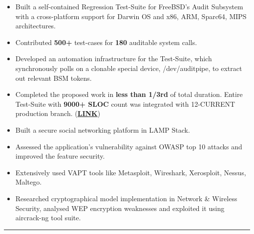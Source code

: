 \documentclass[10pt, margin=0.5in]{deedy-resume-openfont}
\begin{document}
\begin{minipage}[t]{0.48\textwidth}
\vspace{5pt}
\begin{itemize}[leftmargin=*, noitemsep]
\item Built a self-contained Regression Test-Suite for FreeBSD's Audit Subsystem with a cross-platform support for Darwin OS and x86, ARM, Sparc64, MIPS architectures.
  \item Contributed \textbf{500+} test-cases for \textbf{180} auditable system calls.
  \item Developed an automation infrastructure for the Test-Suite, which synchronously polls on a clonable special device, /dev/auditpipe, to extract out relevant BSM tokens.
  \item	Completed the proposed work in \textbf{less than 1/3rd} of total duration. Entire Test-Suite with \textbf{9000+ SLOC} count was integrated with 12-CURRENT production branch. (\href{https://github.com/freebsd/freebsd/tree/master/tests/sys/audit}{\textbf{LINK}})
\end{itemize}


\vspace{5pt}
\begin{itemize}[leftmargin=*, noitemsep]
  \item Built a secure social networking platform in LAMP Stack.
  \item Assessed the application's vulnerability against OWASP top 10 attacks and improved the feature security.
  \item Extensively used VAPT tools like Metasploit, Wireshark, Xerosploit, Nessus, Maltego.
  \item	Researched cryptographical model implementation in Network \& Wireless Security, analysed WEP encryption weaknesses and exploited it using aircrack-ng tool suite.
\end{itemize}


\vspace{-2pt}				%
\rule{\textwidth}{0.5pt}	%
\vspace{-14pt}				%

%
%

\end{minipage}
\end{document}
